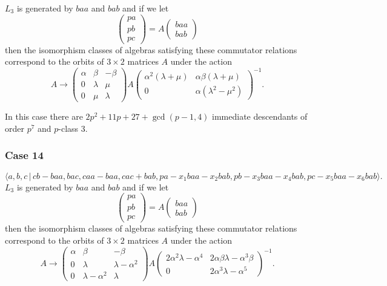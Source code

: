 \documentclass[10pt]{article}
\begin{document}
$L_{3}$ is generated by $baa$ and $bab$ and if we let 
\[
\left( 
\begin{array}{l}
pa \\ 
pb \\ 
pc%
\end{array}%
\right) =A\left( 
\begin{array}{l}
baa \\ 
bab%
\end{array}%
\right) 
\]%
then the isomorphism classes of algebras satisfying these commutator
relations correspond to the orbits of $3\times 2$ matrices $A$ under the
action 
\[
A\rightarrow \left( 
\begin{array}{lll}
\alpha & \beta & -\beta \\ 
0 & \lambda & \mu \\ 
0 & \mu & \lambda%
\end{array}%
\right) A\left( 
\begin{array}{ll}
\alpha ^{2}(\lambda +\mu ) & \alpha \beta (\lambda +\mu ) \\ 
0 & \alpha (\lambda ^{2}-\mu ^{2})%
\end{array}%
\right) ^{-1}. 
\]%
$\allowbreak \allowbreak $

In this case there are $2p^{2}+11p+27+\gcd (p-1,4)$ immediate descendants of
order $p^{7}$ and $p$-class 3.

\subsubsection{Case 14}

\begin{equation}
\langle
a,b,c\,|%
\,cb-baa,bac,caa-baa,cac+bab,pa-x_{1}baa-x_{2}bab,pb-x_{3}baa-x_{4}bab,pc-x_{5}baa-x_{6}bab\rangle .
\tag{7.770}
\end{equation}%
$L_{3}$ is generated by $baa$ and $bab$ and if we let 
\[
\left( 
\begin{array}{l}
pa \\ 
pb \\ 
pc%
\end{array}%
\right) =A\left( 
\begin{array}{l}
baa \\ 
bab%
\end{array}%
\right) 
\]%
then the isomorphism classes of algebras satisfying these commutator
relations correspond to the orbits of $3\times 2$ matrices $A$ under the
action 
\[
A\rightarrow \left( 
\begin{array}{lll}
\alpha & \beta & -\beta \\ 
0 & \lambda & \lambda -\alpha ^{2} \\ 
0 & \lambda -\alpha ^{2} & \lambda%
\end{array}%
\right) A\left( 
\begin{array}{ll}
2\alpha ^{2}\lambda -\alpha ^{4} & 2\alpha \beta \lambda -\alpha ^{3}\beta
\\ 
0 & 2\alpha ^{3}\lambda -\alpha ^{5}%
\end{array}%
\right) ^{-1}. 
\]%
$\allowbreak \allowbreak $
\end{document}
